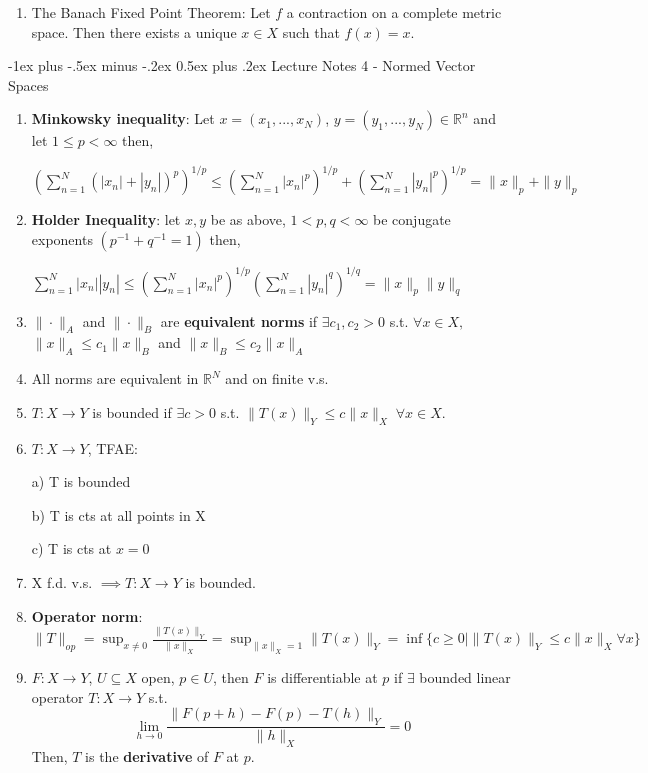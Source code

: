 \documentclass[10pt,landscape]{article}
\makeatletter
\renewcommand{\section}{\@startsection{section}{1}{0mm}%
                                {-1ex plus -.5ex minus -.2ex}%
                                {0.5ex plus .2ex}%
                                {\normalfont\large\bfseries}}
\makeatother
\begin{document}
\begin{multicols}{3}
\begin{enumerate}
	\item The Banach Fixed Point Theorem: Let $f$ a contraction on a complete metric space. Then there exists a unique $x \in X$ such that $f(x) = x$.
	
\end{enumerate}

\section{Lecture Notes 4 - Normed Vector Spaces}
\begin{enumerate}
	\item \textbf{Minkowsky inequality}: Let $x = (x_1, ..., x_N)$, $ y = (y_1, ..., y_N) \in \mathbb{R}^n$ and let $1 \leq p < \infty$ then, 

$
\left(\sum^N_{n=1} ( |x_n|+|y_n| )^p \right)^{1/p}  \leq \left( \sum^N_{n=1} |x_n|^p \right)^{1/p}+ \left( \sum^N_{n=1} |y_n|^p \right)^{1/p} 
= \|x\|_p +\|y\|_p
$
	\item \textbf{Holder Inequality}: let $x,y$ be as above, $1<p,q<\infty$ be conjugate exponents $(p^{-1}+ q^{-1} = 1)$ then, 
	
$\sum^N_{n=1} |x_n| |y_n| \leq \left( \sum^N_{n=1} |x_n|^p \right)^{1/p}\left( \sum^N_{n=1} |y_n|^q \right)^{1/q} = \| x\|_p \| y\|_q $
	\item $\|\cdot \|_A $ and $\| \cdot\|_B$ are \textbf{equivalent norms} if $\exists c_1, c_2>0$ s.t. $\forall x \in X,$ $\| x\|_A\leq c_1 \| x\|_B$ and $\|x\|_B \leq c_2\|x\|_A$
	\item All norms are equivalent in $\mathbb{R}^N$ and on finite v.s. 
	\item $T: X \rightarrow Y$ is bounded if $\exists c>0$ s.t. $\|T(x)\|_Y \leq c\|x\|_X \; \forall x \in X$.
	\item $T: X\rightarrow Y$, TFAE:
	
	a) T is bounded
	
	b) T is cts at all points in X
	
	c) T is cts at $x=0$
	\item X f.d. v.s. $\implies T:X \rightarrow Y $ is bounded.
	\item \textbf{Operator norm}: $\| T\|_{op} = \sup_{x\neq 0} \frac{ \|T(x) \|_Y}{\| x \|_X} = \sup_{\|x\|_X = 1} \|T(x)\|_Y = \inf \{ c\geq 0 \mid \|T(x)\|_Y\leq c\|x\|_X \forall x\} $
	\item $F: X\rightarrow Y$, $U\subseteq X$ open, $p \in U$, then $F$ is differentiable at $p$ if $\exists$ bounded linear operator $T: X \rightarrow Y$ s.t.
	$$\lim_{h\rightarrow 0} \frac{\|F(p+h) -F(p) -T(h) \|_Y}{\|h\|_X} = 0 $$
	Then, $T$ is the \textbf{derivative} of $F$ at $p$. 
	 

\end{enumerate}
\end{multicols}
\end{document}
